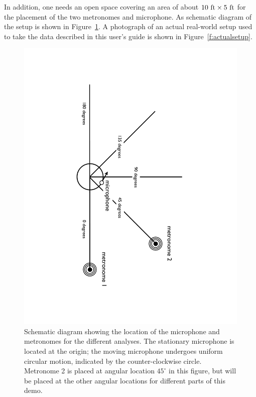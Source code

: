 \documentclass[10pt]{NSF}
\begin{document}
In addition, one needs an open space covering an area of 
about $10~{\rm ft}\times 5~{\rm ft}$ 
for the placement of the two metronomes and microphone.
As schematic diagram of the setup is shown in
Figure~\ref{f:setup}.
A photograph of an actual real-world setup used to take the
data described in this user's guide is shown in
Figure~\ref{f:actualsetup}.
%
\begin{figure}[hbtp!]
\begin{center}
\includegraphics[clip=true, angle=90, width=\textwidth]{figures/setup-circular}
\caption{Schematic diagram showing the location of the microphone 
and metronomes for the different analyses.
The stationary microphone is located at the origin;
the moving microphone undergoes uniform circular motion, 
indicated by the counter-clockwise circle.
Metronome 2 is placed at angular location $45^\circ$ in this figure,
but will be placed at the other angular locations for different parts
of this demo.}
\label{f:setup}
\end{center}
\end{figure}
\end{document}
